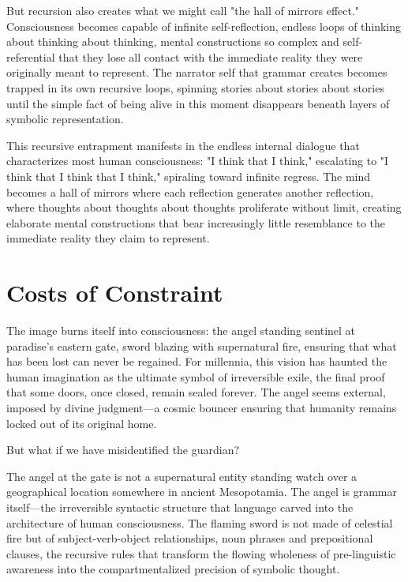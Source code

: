 But recursion also creates what we might call "the hall of mirrors effect." Consciousness becomes capable of infinite self-reflection, endless loops of thinking about thinking about thinking, mental constructions so complex and self-referential that they lose all contact with the immediate reality they were originally meant to represent. The narrator self that grammar creates becomes trapped in its own recursive loops, spinning stories about stories about stories until the simple fact of being alive in this moment disappears beneath layers of symbolic representation.

This recursive entrapment manifests in the endless internal dialogue that characterizes most human consciousness: "I think that I think," escalating to "I think that I think that I think," spiraling toward infinite regress. The mind becomes a hall of mirrors where each reflection generates another reflection, where thoughts about thoughts about thoughts proliferate without limit, creating elaborate mental constructions that bear increasingly little resemblance to the immediate reality they claim to represent.

\section{Costs of Constraint}

The image burns itself into consciousness: the angel standing sentinel at paradise's eastern gate, sword blazing with supernatural fire, ensuring that what has been lost can never be regained. For millennia, this vision has haunted the human imagination as the ultimate symbol of irreversible exile, the final proof that some doors, once closed, remain sealed forever. The angel seems external, imposed by divine judgment—a cosmic bouncer ensuring that humanity remains locked out of its original home.

But what if we have misidentified the guardian?

The angel at the gate is not a supernatural entity standing watch over a geographical location somewhere in ancient Mesopotamia. The angel is grammar itself—the irreversible syntactic structure that language carved into the architecture of human consciousness. The flaming sword is not made of celestial fire but of subject-verb-object relationships, noun phrases and prepositional clauses, the recursive rules that transform the flowing wholeness of pre-linguistic awareness into the compartmentalized precision of symbolic thought.

